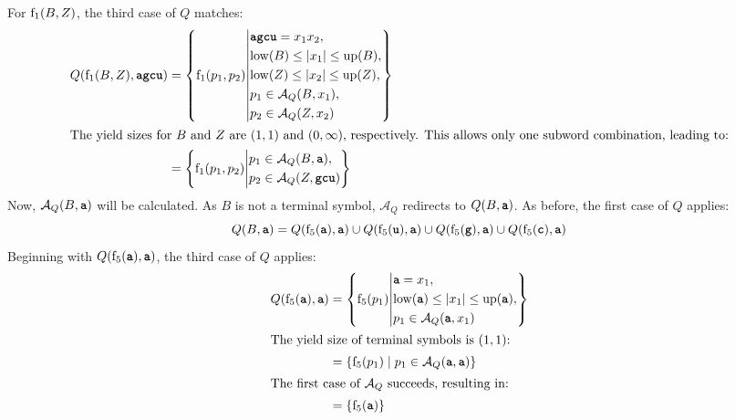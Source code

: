 \documentclass[
    a4paper,
    12pt,
    twoside,
    BCOR=12mm,
    parskip=half,
    chapterprefix,
    numbers=noenddot,
    bibliography=totoc
]{scrbook}
\begin{document}
\begin{example}
  For $\mathrm{f}_1(B,Z)$, the third case of $Q$ matches:
  \begin{align*}
    Q(\op{f}_1(B,Z),\ts{agcu}) &= \left\{ \op{f}_1(p_1,p_2) \middle\vert
      \begin{aligned}
				&\ts{agcu}=x_1 x_2,\\
				&\op{low}(B) \leq |x_1| \leq \op{up}(B),\\
        &\op{low}(Z) \leq |x_2| \leq \op{up}(Z),\\
				&p_1 \in \mathcal{A}_Q(B,x_1),\\
        &p_2 \in \mathcal{A}_Q(Z,x_2)
      \end{aligned}
		\right\}\\
    \intertext{The yield sizes for $B$ and $Z$ are $(1,1)$ and $(0,\infty)$, respectively. This allows only one subword combination, leading to:}
    &= \left\{ \op{f}_1(p_1,p_2) \middle\vert
      \begin{aligned}
				&p_1 \in \mathcal{A}_Q(B,\ts{a}),\\
        &p_2 \in \mathcal{A}_Q(Z,\ts{gcu})
      \end{aligned}
		\right\}
  \end{align*}
  Now, $\mathcal{A}_Q(B,\ts{a})$ will be calculated. As $B$ is not a terminal symbol, $\mathcal{A}_Q$ redirects to $Q(B,\ts{a})$. As before, the first case of $Q$ applies:
  \[ Q(B,\ts{a}) = Q(\op{f}_5(\ts{a}),\ts{a}) \cup Q(\op{f}_5(\ts{u}),\ts{a}) \cup Q(\op{f}_5(\ts{g}),\ts{a}) \cup Q(\op{f}_5(\ts{c}),\ts{a}) \]
  Beginning with $Q(\op{f}_5(\ts{a}),\ts{a})$, the third case of $Q$ applies:
  \begin{align*}
    Q(\op{f}_5(\ts{a}),\ts{a}) &= \left\{ \op{f}_5(p_1) \middle\vert
      \begin{aligned}
				&\ts{a}=x_1,\\
				&\op{low}(\ts{a}) \leq |x_1| \leq \op{up}(\ts{a}),\\
				&p_1 \in \mathcal{A}_Q(\ts{a},x_1)
      \end{aligned}
		\right\}\\
    \intertext{The yield size of terminal symbols is $(1,1)$:}
    &= \{ \op{f}_5(p_1) \mid p_1 \in \mathcal{A}_Q(\ts{a},\ts{a}) \}\\
    \intertext{The first case of $\mathcal{A}_Q$ succeeds, resulting in:}
    &= \{ \op{f}_5(\ts{a}) \}
  \end{align*}
  

\end{example}
\end{document}
